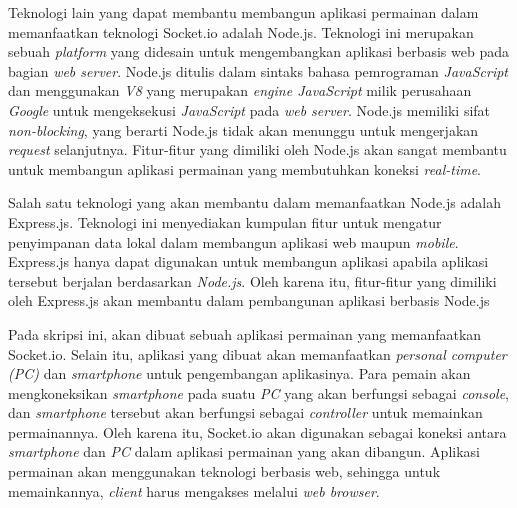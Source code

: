 Teknologi lain yang dapat membantu membangun aplikasi permainan dalam memanfaatkan teknologi Socket.io adalah Node.js. Teknologi ini merupakan sebuah \textit{platform} yang didesain untuk mengembangkan aplikasi berbasis web pada bagian \textit{web server}. Node.js ditulis dalam sintaks bahasa pemrograman \textit{JavaScript} dan menggunakan \textit{V8} yang merupakan \textit{engine JavaScript} milik perusahaan \textit{Google} untuk mengeksekusi \textit{JavaScript} pada \textit{web server}. Node.js memiliki sifat \textit{non-blocking}, yang berarti Node.js tidak akan menunggu untuk mengerjakan \textit{request} selanjutnya. Fitur-fitur yang dimiliki oleh Node.js akan sangat membantu untuk membangun aplikasi permainan yang membutuhkan koneksi \textit{real-time}.

Salah satu teknologi yang akan membantu dalam memanfaatkan Node.js adalah Express.js. Teknologi ini menyediakan kumpulan fitur untuk mengatur penyimpanan data lokal dalam membangun aplikasi web maupun \textit{mobile}. Express.js hanya dapat digunakan untuk membangun aplikasi apabila aplikasi tersebut berjalan berdasarkan \textit{Node.js}. Oleh karena itu, fitur-fitur yang dimiliki oleh Express.js akan membantu dalam pembangunan aplikasi berbasis Node.js

Pada skripsi ini, akan dibuat sebuah aplikasi permainan yang memanfaatkan Socket.io. Selain itu, aplikasi yang dibuat akan memanfaatkan \textit{personal computer (PC)} dan \textit{smartphone} untuk pengembangan aplikasinya. Para pemain akan mengkoneksikan \textit{smartphone} pada suatu \textit{PC} yang akan berfungsi sebagai \textit{console}, dan \textit{smartphone} tersebut akan berfungsi sebagai \textit{controller} untuk memainkan permainannya. Oleh karena itu, Socket.io akan digunakan sebagai koneksi antara \textit{smartphone} dan \textit{PC} dalam aplikasi permainan yang akan dibangun. Aplikasi permainan akan menggunakan teknologi berbasis web, sehingga untuk memainkannya, \textit{client} harus mengakses melalui \textit{web browser}.



